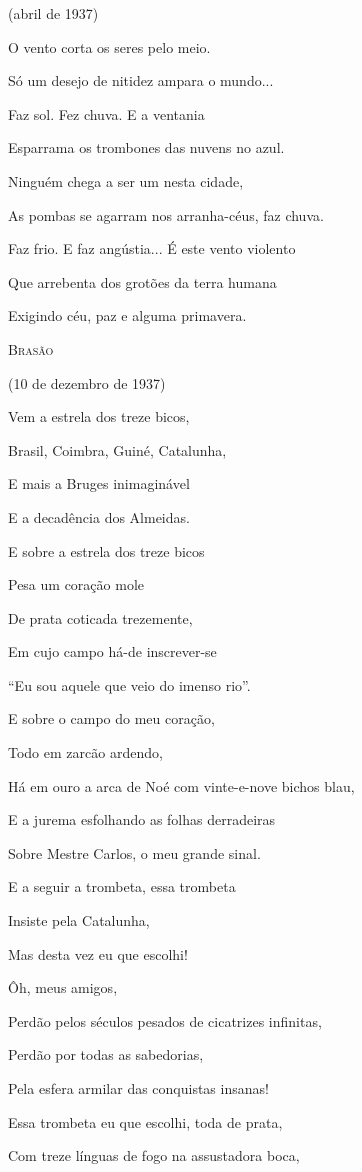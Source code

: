 (abril de 1937)

O vento corta os seres pelo meio.

Só um desejo de nitidez ampara o mundo...

Faz sol. Fez chuva. E a ventania

Esparrama os trombones das nuvens no azul.

Ninguém chega a ser um nesta cidade,

As pombas se agarram nos arranha-céus, faz chuva.

Faz frio. E faz angústia... É este vento violento

Que arrebenta dos grotões da terra humana

Exigindo céu, paz e alguma primavera.

\textsc{Brasão}

(10 de dezembro de 1937)

Vem a estrela dos treze bicos,

Brasil, Coimbra, Guiné, Catalunha,

E mais a Bruges inimaginável

E a decadência dos Almeidas.

E sobre a estrela dos treze bicos

Pesa um coração mole

De prata coticada trezemente,

Em cujo campo há-de inscrever-se

``Eu sou aquele que veio do imenso rio''.

E sobre o campo do meu coração,

Todo em zarcão ardendo,

Há em ouro a arca de Noé com vinte-e-nove bichos blau,

E a jurema esfolhando as folhas derradeiras

Sobre Mestre Carlos, o meu grande sinal.

E a seguir a trombeta, essa trombeta

Insiste pela Catalunha,

Mas desta vez eu que escolhi!

Ôh, meus amigos,

Perdão pelos séculos pesados de cicatrizes infinitas,

Perdão por todas as sabedorias,

Pela esfera armilar das conquistas insanas!

Essa trombeta eu que escolhi, toda de prata,

Com treze línguas de fogo na assustadora boca,

